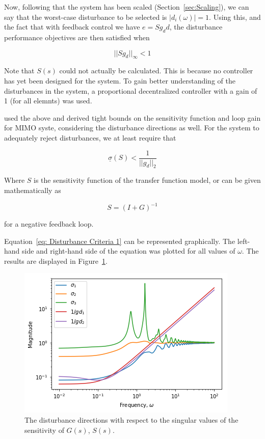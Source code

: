 Now, following that the system has been scaled (Section~\ref{sec:Scaling}), we can say that the worst-case disturbance to be selected is $|d_i(\omega)| = 1$. Using this, and the fact that with feedback control we have $e = Sg_dd$, the disturbance performance objectives are then satisfied when

\begin{equation}
	||Sg_d||_{\infty} < 1
\end{equation}

Note that $S(s)$ could not actually be calculated. This is because no controller has yet been designed for the system. To gain better understanding of the disturbances in the system, a proportional decentralized controller with a gain of 1 (for all elemnts) was used.

\textcite{skogestad} used the above and derived tight bounds on the sensitivity function and loop gain for MIMO syste, considering the disturbance directions as well. For the system to adequately reject disturbances, we at least require that 

\begin{equation}
	\label{eq: Disturbance Criteria 1}
	\underline{\sigma}(S) < \frac{1}{||g_d||_2}
\end{equation}

Where $S$ is the sensitivity function of the transfer function model, or can be given mathematically as 

\begin{equation}
	S = (I + G)^{-1}
\end{equation}

for a negative feedback loop.

Equation~\ref{eq: Disturbance Criteria 1} can be represented graphically. The left-hand side and right-hand side of the equation was plotted for all values of $\omega$. The results are displayed in Figure~\ref{fig:disturbance-analysis-1}.

\begin{figure}[H]
	\centering
	\includegraphics[width=0.7\linewidth]{"Figures/Disturbance Analysis 1"}
	\caption{The disturbance directions with respect to the singular values of the sensitivity of $G(s)$, $S(s)$.}
	\label{fig:disturbance-analysis-1}
\end{figure}

